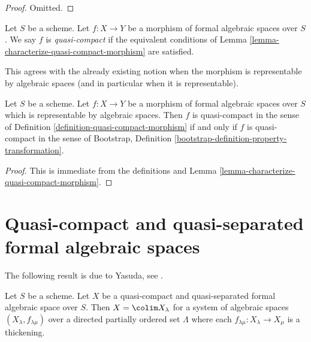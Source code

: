 \begin{proof}
Omitted.
\end{proof}

\begin{definition}
\label{definition-quasi-compact-morphism}
Let $S$ be a scheme. Let $f : X \to Y$ be a morphism of
formal algebraic spaces over $S$.
We say $f$ is {\it quasi-compact} if the equivalent conditions of
Lemma \ref{lemma-characterize-quasi-compact-morphism} are satisfied.
\end{definition}

\noindent
This agrees with the already existing notion when the morphism
is representable by algebraic spaces (and in particular when it is
representable).

\begin{lemma}
\label{lemma-quasi-compact-representable}
Let $S$ be a scheme. Let $f : X \to Y$ be a morphism of formal algebraic
spaces over $S$ which is representable by algebraic spaces.
Then $f$ is quasi-compact in the sense of
Definition \ref{definition-quasi-compact-morphism}
if and only if $f$ is quasi-compact in the sense of
Bootstrap, Definition \ref{bootstrap-definition-property-transformation}.
\end{lemma}

\begin{proof}
This is immediate from the definitions and
Lemma \ref{lemma-characterize-quasi-compact-morphism}.
\end{proof}





\section{Quasi-compact and quasi-separated formal algebraic spaces}
\label{section-quasi-compact-quasi-separated}

\noindent
The following result is due to Yasuda, see
\cite[Proposition 3.32]{Yasuda}.

\begin{lemma}
\label{lemma-structure-quasi-compact-quasi-separated}
\begin{reference}
\cite[Proposition 3.32]{Yasuda}
\end{reference}
Let $S$ be a scheme. Let $X$ be a quasi-compact and quasi-separated
formal algebraic space over $S$. Then $X = \colim X_\lambda$
for a system of algebraic spaces $(X_\lambda, f_{\lambda \mu})$
over a directed partially ordered set $\Lambda$ where each
$f_{\lambda \mu} : X_\lambda \to X_\mu$ is a thickening.
\end{lemma}

